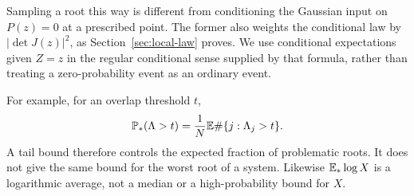 Sampling a root this way is different from conditioning the Gaussian input on
$P(z)=0$ at a prescribed point. The former also weights the conditional law
by $|\det J(z)|^2$, as Section~\ref{sec:local-law} proves. We use conditional
expectations given $Z=z$ in the regular conditional sense supplied by that
formula, rather than treating a zero-probability event as an ordinary event.

For example, for an overlap threshold $t$,
\[
 \mathbb P_*(\Lambda>t)=\frac1N\mathbb E\#\{j:\Lambda_j>t\}.
\]
A tail bound therefore controls the expected fraction of problematic roots.
It does not give the same bound for the worst root of a system. Likewise
$\mathbb E_*\log X$ is a logarithmic average, not a median or a high-probability
bound for $X$.
